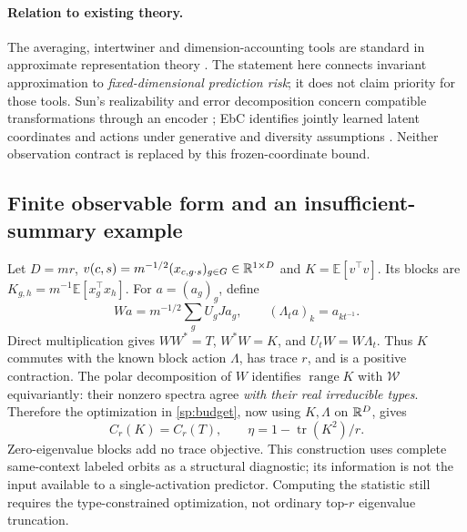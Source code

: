 \paragraph{Relation to existing theory.}
\label{sp:positioning}
The averaging, intertwiner and dimension-accounting tools are standard in approximate representation theory \citep{gowers2017inverse,moore2015approximate}. The statement here connects invariant approximation to \emph{fixed-dimensional prediction risk}; it does not claim priority for those tools. Sun's realizability and error decomposition concern compatible transformations through an encoder \citep{sun2026transformationlaws}; EbC identifies jointly learned latent coordinates and actions under generative and diversity assumptions \citep{schmidt2025equivariance}. Neither observation contract is replaced by this frozen-coordinate bound.

\subsection{Finite observable form and an insufficient-summary example}
\label{sp:observable}
Let $D=mr$, $v(c,s)=m^{-1/2}(x_{c,g\cdot s})_{g\in G}\in\mathbb{R}^{1\times D}$ and $K=\mathbb E[v^\top v]$. Its blocks are $K_{g,h}=m^{-1}\mathbb E[x_g^\top x_h]$. For $a=(a_g)_g$, define
\[
 Wa=m^{-1/2}\sum_gU_gJa_g,\qquad (\Lambda_ta)_k=a_{kt^{-1}}.
\]
Direct multiplication gives $WW^*=T$, $W^*W=K$, and $U_tW=W\Lambda_t$. Thus $K$ commutes with the known block action $\Lambda$, has trace $r$, and is a positive contraction. The polar decomposition of $W$ identifies $\operatorname{range}K$ with $\mathcal W$ equivariantly: their nonzero spectra agree \emph{with their real irreducible types}. Therefore the optimization in \cref{sp:budget}, now using $K,\Lambda$ on $\mathbb{R}^D$, gives
\[
 C_r(K)=C_r(T),\qquad \eta=1-\operatorname{tr}(K^2)/r.
\]
Zero-eigenvalue blocks add no trace objective. This construction uses complete same-context labeled orbits as a structural diagnostic; its information is not the input available to a single-activation predictor. Computing the statistic still requires the type-constrained optimization, not ordinary top-$r$ eigenvalue truncation.

